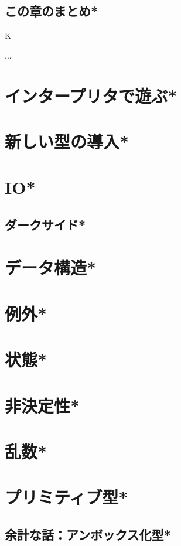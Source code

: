 \documentclass[a4paper,twocolumn]{jsbook}
\newenvironment{note}[1]{\begin{boxnote}\begin{center}#1\end{center}}{\end{boxnote}}
\begin{document}
\section{この章のまとめ*}

\begin{note}{K}
...
\end{note}


\chapter{インタープリタで遊ぶ*}
\chapter{新しい型の導入*}

\chapter{IO*}
\section{ダークサイド*}
\chapter{データ構造*}
\chapter{例外*}
\chapter{状態*}
\chapter{非決定性*}
\chapter{乱数*}
\chapter{プリミティブ型*}
\section{余計な話：アンボックス化型*}



\end{document}
